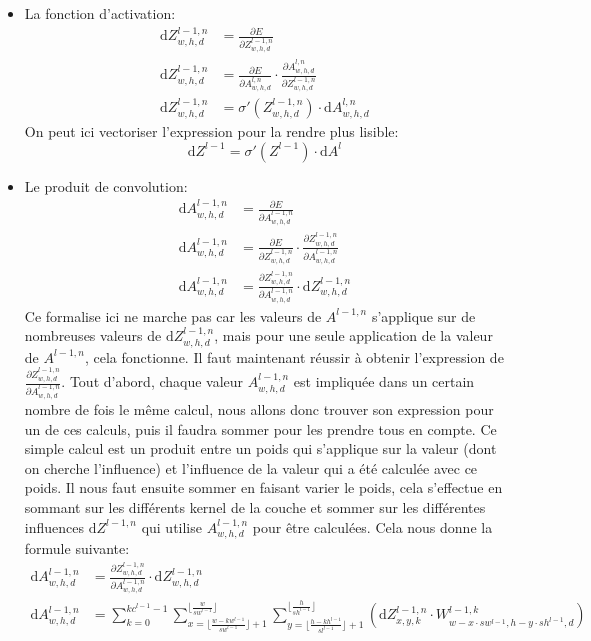 \documentclass[12pt,a4paper]{extarticle}
\newcommand{\ud}{\mathrm{d}}
\begin{document}
\begin{itemize}
\item La fonction d'activation:\\
\begin{align}
		\ud Z^{l-1,n}_{w,h,d}&=\frac{\partial E}{\partial Z^{l-1,n}_{w,h,d}} \\
		\ud Z^{l-1,n}_{w,h,d}&=\frac{\partial E}{\partial A^{l,n}_{w,h,d}}\cdot \frac{\partial A^{l,n}_{w,h,d}}{\partial Z^{l-1,n}_{w,h,d}} \\
		\ud Z^{l-1,n}_{w,h,d}&=\sigma '(Z^{l-1,n}_{w,h,d}) \cdot \ud A^{l,n}_{w,h,d}
\end{align}
On peut ici vectoriser l'expression pour la rendre plus lisible:
\begin{equation}
\ud Z^{l-1} = \sigma '(Z^{l-1}) \cdot \ud A^{l}
\end{equation}


\item Le produit de convolution:\\
\begin{align}		
		\ud A^{l-1,n}_{w,h,d} &= \frac{\partial E}{\partial A^{l-1,n}_{w,h,d}} \\
		\ud A^{l-1,n}_{w,h,d}&=\frac{\partial E}{\partial Z^{l-1,n}_{w,h,d}}\cdot \frac{\partial Z^{l-1,n}_{w,h,d}}{\partial A^{l-1,n}_{w,h,d}} \\
		\ud A^{l-1,n}_{w,h,d}&=\frac{\partial Z^{l-1,n}_{w,h,d}}{\partial A^{l-1,n}_{w,h,d}} \cdot \ud Z^{l-1,n}_{w,h,d} 
\end{align}
Ce formalise ici ne marche pas car les valeurs de $A^{l-1,n}$ s'applique sur de nombreuses valeurs de $\ud Z^{l-1,n}_{w,h,d}$, mais pour une seule application de la valeur de $A^{l-1,n}$, cela fonctionne. 
Il faut maintenant réussir à obtenir l'expression de $\frac{\partial Z^{l-1,n}_{w,h,d}}{\partial A^{l-1,n}_{w,h,d}}$.
Tout d'abord, chaque valeur $A^{l-1,n}_{w,h,d}$ est impliquée dans un certain nombre de fois le même calcul, nous allons donc trouver son expression pour un de ces calculs, puis il faudra sommer pour les prendre tous en compte. Ce simple calcul est un produit entre un poids qui s'applique sur la valeur (dont on cherche l'influence) et l'influence de la valeur qui a été calculée avec ce poids. Il nous faut ensuite sommer en faisant varier le poids, cela s'effectue en sommant sur les différents kernel de la couche et sommer sur les différentes influences $\ud Z^{l-1,n}$ qui utilise $A^{l-1,n}_{w,h,d}$ pour être calculées.
Cela nous donne la formule suivante:
\begin{align}
	\ud A^{l-1,n}_{w,h,d}&=\frac{\partial Z^{l-1,n}_{w,h,d}}{\partial A^{l-1,n}_{w,h,d}} \cdot \ud Z^{l-1,n}_{w,h,d} \\
	\ud A^{l-1,n}_{w,h,d} &=  \sum_{k=0}^{kc^{l-1}-1}\sum_{x=\lfloor\frac{w-kw^{l-1}}{sw^{l-1}} \rfloor+1}^{\lfloor \frac{w}{sw^{l-1}} \rfloor}\sum_{y=\lfloor\frac{h-kh^{l-1}}{sl^{l-1}} \rfloor+1}^{\lfloor \frac{h}{sh^{l-1}} \rfloor}(\ud Z^{l-1,n}_{x,y,k}\cdot W^{l-1,k}_{w-x\cdot sw^{l-1}, h - y\cdot sh^{l-1}, d})
\end{align}


\end{itemize}
\end{document}
